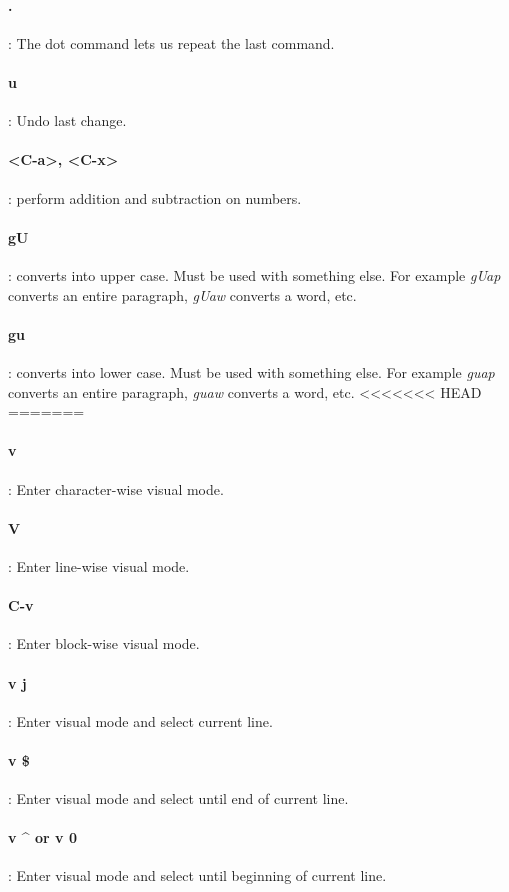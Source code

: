 \documentclass[10pt,letterpaper]{book}
\begin{document}
\paragraph{.}: The dot command lets us repeat the last command.
\paragraph{u}: Undo last change.
\paragraph{<C-a>, <C-x>}: perform addition and subtraction on numbers.
\paragraph{gU}: converts into upper case. Must be used with something else. For example \textit{gUap} converts an entire paragraph, \textit{gUaw} converts a word, etc.
\paragraph{gu}: converts into lower case. Must be used with something else. For example \textit{guap} converts an entire paragraph, \textit{guaw} converts a word, etc.
<<<<<<< HEAD
=======
\paragraph{v}: Enter character-wise visual mode.
\paragraph{V}: Enter line-wise visual mode.
\paragraph{C-v}: Enter block-wise visual mode.

\paragraph{v j}: Enter visual mode and select current line.
\paragraph{v \$ }: Enter visual mode and select until end of current line.
\paragraph{v  \^{} or v 0}: Enter visual mode and select until beginning of current line.
\end{document}
